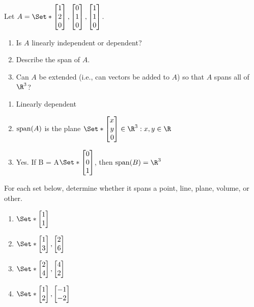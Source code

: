\begin{exercises}
	
	\begin{problist}
		\prob Let $A=\Set*{\mat{1\\2\\0},\mat{0\\1\\0},\mat{1\\1\\0}}$.
		\begin{enumerate}
			\item Is $A$
			linearly independent or dependent?
			
			\item Describe the span of $A$.
			
			\item Can $A$ be extended (i.e., can vectors be added to $A$) so that
			$A$ spans all of $\R^3$?
		\end{enumerate}
		\begin{solution}
			\begin{enumerate}
				\item Linearly dependent
				\item $\operatorname{span}(A)$ is the plane $\Set*{\mat{x \\y \\0} \in\R^3: x,y\in\R}$
				\item Yes. If B = A\cup$\Set*{\mat{0\\0\\1}}$, then $\Span(B)=\R^3$
			\end{enumerate}
		\end{solution}
		
		\prob For each set below, determine whether it spans a point,
		line, plane, volume, or other. \label{PROBSET3-SETS}
		\begin{enumerate}
			\item $\Set*{\mat{1\\1}}$
			
			\item $\Set*{\mat{1\\3},\mat{2\\6}}$
			
			\item $\Set*{\mat{2\\4},\mat{4\\2}}$
			
			\item $\Set*{\mat{1\\2},\mat{-1\\-2}}$
			

\end{enumerate}
\end{problist}
\end{exercises}
